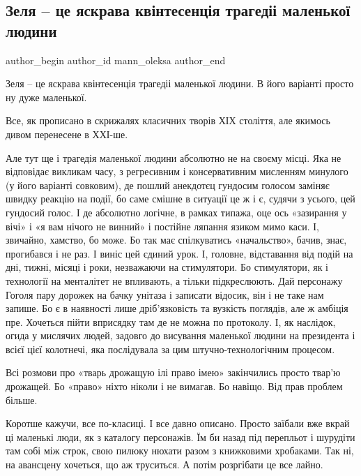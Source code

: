 
 
 
 
 
 
\subsection{Зеля – це яскрава квінтесенція трагедіі маленької людини}
\label{sec:29_01_2022.fb.mann_oleksa.1.zelja_malenka_ljudyna}
 
\ifcmt
 author_begin
   author_id mann_oleksa
 author_end
\fi

Зеля – це яскрава квінтесенція трагедіі маленької людини. В його варіанті просто
ну дуже маленької.

Все, як прописано в скрижалях класичних творів ХІХ століття, але якимось дивом
перенесене в ХХІ-ше. 

Але тут ще і трагедія маленької людини абсолютно не на своєму місці. Яка не
відповідає викликам часу, з регресивним і консервативним мисленням минулого (у
його варіанті совковим), де пошлий анекдотєц гундосим голосом заміняє швидку
реакцію на події, бо саме смішне в ситуації це ж і є, судячи з усього, цей
гундосий голос. І де абсолютно логічне, в рамках типажа, оце ось «зазирання у
вічі» і «я вам нічого не винний» і постійне ляпання язиком мимо каси. І,
звичайно, хамство, бо може. Бо так має спілкуватись «начальство», бачив, знає,
прогибався і не раз. І виніс цей єдиний урок. І, головне, відставання від подій
на дні, тижні, місяці і роки, незважаючи на стимулятори. Бо стимулятори, як і
технології на менталітет не впливають, а тільки підкреслюють. Дай персонажу
Гоголя пару дорожек на бачку унітаза і записати відосик, він і не таке нам
запише. Бо є в наявності лише дріб’язковість та вузкість поглядів, але ж
амбіція пре. Хочеться пійти вприсядку там де не можна по протоколу. І, як
наслідок, огида у мислячих людей, задовго до висування маленької людини на
президента і всієї цієї колотнечі, яка послідувала за цим штучно-технологічним
процесом. 

Всі розмови про «тварь дрожащую ілі право імею» закінчились просто твар’ю
дрожащей. Бо «право» ніхто ніколи і не вимагав. Бо навіщо. Від прав проблем
більше. 

Коротше кажучи, все по-класиці. І все давно описано. Просто заїбали вже вкрай
ці маленькі люди, як з каталогу персонажів. Їм би назад під перепльот і
шурудіти там собі між строк, свою пилюку нюхати разом з книжковими хробаками.
Так ні, на авансцену хочеться, що аж труситься. А потім розргібати це все
лайно.
